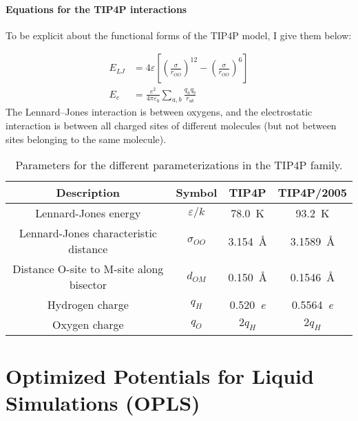\paragraph{Equations for the TIP4P interactions}
To be explicit about the functional forms of the TIP4P model, I give them below:

\begin{align}
	E_{LJ} & = 4\varepsilon\left[\left(\frac{\sigma}{r_{OO}}\right)^{12} - \left(\frac{\sigma}{r_{OO}}\right)^{6}\right]
	\label{eq:part1:lennardjonespotential}
	\\
	E_{\si{\elementarycharge}} & = \frac{\si{\elementarycharge\squared}}{4\pi\varepsilon_0} \sum_{a, b} \frac{q_aq_b}{r_{ab}}
	\label{eq:part1:electrostaticpotential}
\end{align} 
The Lennard--Jones interaction is between oxygens, and the electrostatic interaction is between all charged sites of different molecules (but not between sites belonging to the same molecule).

\begin{table}
\caption{Parameters for the different parameterizations in the TIP4P family.}
\label{tbl:tip4p_parameters}
\begin{tabular}{c|c|c|c}
Description & Symbol & TIP4P & TIP4P/2005 \\ 
\hline
Lennard-Jones energy & $\varepsilon/k$ & \SI{78.0}{\kelvin} & \SI{93.2}{\kelvin} \\
Lennard-Jones characteristic distance & $\sigma_{OO}$ & \SI{3.154}{\angstrom} & \SI{3.1589}{\angstrom} \\
Distance O-site to M-site along bisector & $d_{OM}$ & \SI{0.150}{\angstrom} & \SI{0.1546}{\angstrom} \\
Hydrogen charge & $q_H$ & \SI{0.520}{\elementarycharge} & \SI{0.5564}{\elementarycharge} \\
Oxygen charge & $q_O$ & $2q_H$ & $2q_H$ 
\end{tabular}
\end{table}

\section{Optimized Potentials for Liquid Simulations (OPLS)}

